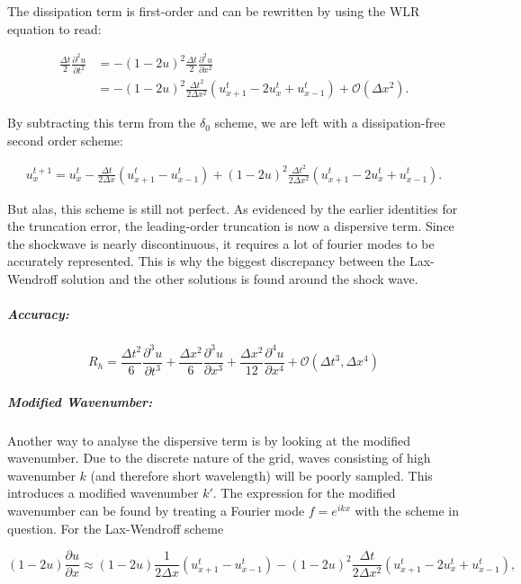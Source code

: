\documentclass[11pt]{article}
\begin{document}
The dissipation term is first-order and can be rewritten by using the
WLR equation to read:

\begin{align}
    \frac{\Delta t}{2}\frac{\partial^2 u}{\partial t^2} &= -(1-2u)^2\frac{\Delta t}{2}\frac{\partial^2 u}{\partial x^2} \\
    &= -(1-2u)^2\frac{\Delta t^2}{2 \Delta x^2} (u_{x+1}^t - 2u_x^t + u_{x-1}^t) + \mathcal{O}(\Delta x^2).
\end{align}

By subtracting this term from the \(\delta_0\) scheme, we are left with
a dissipation-free second order scheme:

\begin{align}
    u_x^{t+1} = u_x^t - \frac{\Delta t}{2 \Delta x}(u_{x+1}^t - u_{x-1}^t) + (1-2u)^2\frac{\Delta t^2}{2 \Delta x^2} (u_{x+1}^t - 2u_x^t + u_{x-1}^t). 
 \end{align}

But alas, this scheme is still not perfect. As evidenced by the earlier
identities for the truncation error, the leading-order truncation is now
a dispersive term. Since the shockwave is nearly discontinuous, it
requires a lot of fourier modes to be accurately represented. This is
why the biggest discrepancy between the Lax-Wendroff solution and the
other solutions is found around the shock wave.

\subparagraph{Accuracy:}\label{accuracy}

\begin{equation}
R_h = \frac{\Delta t^2}{6} \frac{\partial^3 u}{\partial t^3} + \frac{\Delta x^2}{6}\frac{\partial^3 u}{\partial x^3} + \frac{\Delta x^2}{12}\frac{\partial^4 u}{\partial x^4} + \mathcal{O}(\Delta t^3, \Delta x^4)
\end{equation}

\subparagraph{Modified Wavenumber:}\label{modified-wavenumber}

Another way to analyse the dispersive term is by looking at the modified
wavenumber. Due to the discrete nature of the grid, waves consisting of
high wavenumber \(k\) (and therefore short wavelength) will be poorly
sampled. This introduces a modified wavenumber \(k'\). The expression
for the modified wavenumber can be found by treating a Fourier mode
\(f = e^{ikx}\) with the scheme in question. For the Lax-Wendroff scheme

\begin{equation}
    (1-2u)\frac{\partial u}{\partial x} \approx (1-2u)\frac{1}{2 \Delta x} (u_{x+1}^t - u_{x-1}^t) - (1-2u)^2\frac{\Delta t}{2 \Delta x^2} (u_{x+1}^t - 2u_x^t + u_{x-1}^t),
\end{equation}
\end{document}
